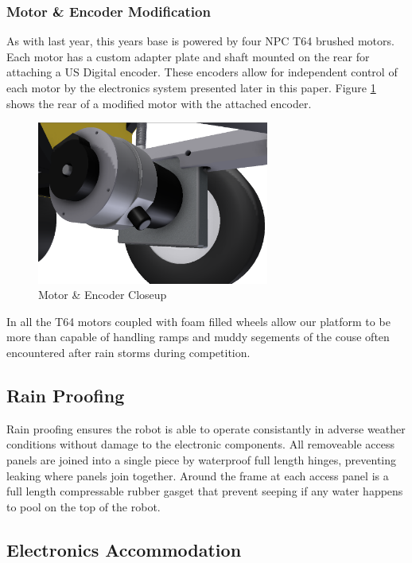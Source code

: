 \subsubsection{Motor \& Encoder Modification}
As with last year, this years base is powered by four NPC T64 brushed motors. Each motor has a custom adapter plate and shaft mounted on the rear for attaching a US Digital encoder. These encoders allow for independent control of each motor by the electronics system presented later in this paper. Figure \ref{FIG:motorencoder} shows the rear of a modified motor with the attached encoder.

\begin{figure}[H]
\begin{center}
\includegraphics[width=3in]{./pics/encodermotor.png}
\caption{Motor \& Encoder Closeup}
\label{FIG:motorencoder}
\end{center}
\end{figure}

In all the T64 motors coupled with foam filled wheels allow our platform to be more than capable of handling ramps and muddy segements of the couse often encountered after rain storms during competition. 

\subsection{Rain Proofing}
Rain proofing ensures the robot is able to operate consistantly in adverse weather conditions without damage to the electronic components. All removeable access panels are joined into a single piece by waterproof full length hinges, preventing leaking where panels join together. Around the frame at each access panel is a full length compressable rubber gasget that prevent seeping if any water happens to pool on the top of the robot.

\subsection{Electronics Accommodation}
